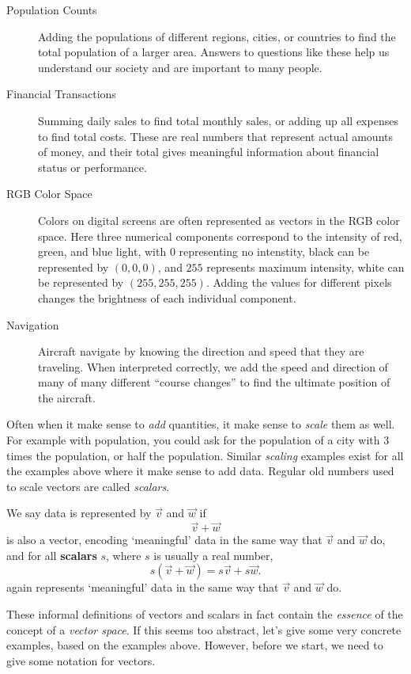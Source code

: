 \documentclass{ximera}
\begin{document}
\begin{concept}
\begin{description}
\item[Population Counts] Adding the populations of different regions,
  cities, or countries to find the total population of a larger
  area. Answers to questions like these help us understand our
  society and are important to many people.
\item[Financial Transactions] Summing daily sales to find total
  monthly sales, or adding up all expenses to find total costs. These
  are real numbers that represent actual amounts of money, and their
  total gives meaningful information about financial status or
  performance.
\item[RGB Color Space] Colors on digital screens are often represented
  as vectors in the RGB color space. Here three numerical components
  correspond to the intensity of red, green, and blue light, with $0$
  representing no intenstity, black can be represented by $(0,0,0)$,
  and $255$ represents maximum intensity, white can be represented by
  $(255,255,255)$.  Adding the values for different pixels changes the
  brightness of each individual component.
\item[Navigation] Aircraft navigate by knowing the direction and speed
  that they are traveling. When interpreted correctly, we add the
  speed and direction of many of many different ``course changes'' to
  find the ultimate position of the aircraft.
\end{description}
\end{concept}
Often when it make sense to \textit{add} quantities, it make sense to
\textit{scale} them as well. For example with population, you could
ask for the population of a city with $3$ times the population, or
half the population. Similar \textit{scaling} examples exist for all
the examples above where it make sense to add data. Regular old
numbers used to scale vectors are called \textit{scalars}.


\begin{definition}
  We say data is represented by  $\vec{v}$ and $\vec{w}$
  if
  \[
  \vec{v}+\vec{w}
  \]
  is also a vector, encoding `meaningful' data in the same way that
  $\vec{v}$ and $\vec{w}$ do, and for all \textbf{scalars} $s$, where
  $s$ is usually a real number,
  \[
  s(\vec{v} + \vec{w}) = s\vec{v}+ s\vec{w}.
  \]
  again represents `meaningful' data in the same way that $\vec{v}$
  and $\vec{w}$ do.
\end{definition}
These informal definitions of vectors and scalars in fact contain the
\textit{essence} of the concept of a \textit{vector space}. If this
seems too abstract, let's give some very concrete examples, based on
the examples above. However, before we start, we need to give some
notation for vectors.
\end{document}
